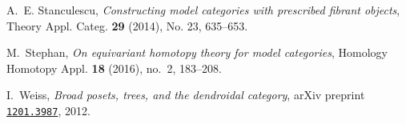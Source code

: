 \documentclass[a4paper,10pt]{article}%
\numberwithin{equation}{section}
\numberwithin{figure}{section}
\theoremstyle{definition} %
\newcommand{\1}{\ensuremath{\mathbbm 1}}%
\begin{document}
\begin{thebibliography}{CM13b}
	A.~E. Stanculescu, \emph{Constructing model categories with prescribed fibrant
		objects}, Theory Appl. Categ. \textbf{29} (2014), No. 23, 635--653.
	
	M.~Stephan, \emph{On equivariant homotopy theory for model categories},
	Homology Homotopy Appl. \textbf{18} (2016), no.~2, 183--208.
	
	I.~Weiss, \emph{Broad posets, trees, and the dendroidal category}, arXiv
	preprint \href{https://arxiv.org/abs/1201.3987}{\texttt{1201.3987}}, 2012.
	
\end{thebibliography}
\end{document}
